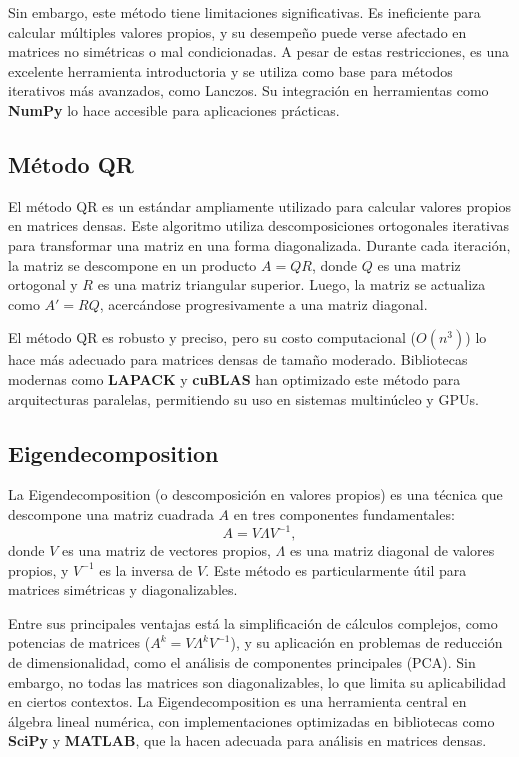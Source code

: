 \documentclass{article}
\begin{document}
Sin embargo, este método tiene limitaciones significativas. Es ineficiente para calcular múltiples valores propios, y su desempeño puede verse afectado en matrices no simétricas o mal condicionadas. A pesar de estas restricciones, es una excelente herramienta introductoria y se utiliza como base para métodos iterativos más avanzados, como Lanczos. Su integración en herramientas como \textbf{NumPy} lo hace accesible para aplicaciones prácticas.

\subsection{Método QR}
El método QR es un estándar ampliamente utilizado para calcular valores propios en matrices densas. Este algoritmo utiliza descomposiciones ortogonales iterativas para transformar una matriz en una forma diagonalizada. Durante cada iteración, la matriz se descompone en un producto \(A = QR\), donde \(Q\) es una matriz ortogonal y \(R\) es una matriz triangular superior. Luego, la matriz se actualiza como \(A' = RQ\), acercándose progresivamente a una matriz diagonal.

El método QR es robusto y preciso, pero su costo computacional (\(O(n^3)\)) lo hace más adecuado para matrices densas de tamaño moderado. 
Bibliotecas modernas como \textbf{LAPACK} y \textbf{cuBLAS} han optimizado este método para arquitecturas paralelas, permitiendo su uso en sistemas multinúcleo y GPUs.

\subsection{Eigendecomposition}
La Eigendecomposition (o descomposición en valores propios) es una técnica que descompone una matriz cuadrada \(A\) en tres componentes fundamentales:
\[
A = V \Lambda V^{-1},
\]
donde \(V\) es una matriz de vectores propios, \(\Lambda\) es una matriz diagonal de valores propios, y \(V^{-1}\) es la inversa de \(V\). Este método es particularmente útil para matrices simétricas y diagonalizables.

Entre sus principales ventajas está la simplificación de cálculos complejos, como potencias de matrices (\(A^k = V \Lambda^k V^{-1}\)), y su aplicación en problemas de reducción de dimensionalidad, como el análisis de componentes principales (PCA). Sin embargo, no todas las matrices son diagonalizables, lo que limita su aplicabilidad en ciertos contextos. La Eigendecomposition es una herramienta central en álgebra lineal numérica, con implementaciones optimizadas en bibliotecas como \textbf{SciPy} y \textbf{MATLAB}, que la hacen adecuada para análisis en matrices densas.
\end{document}
